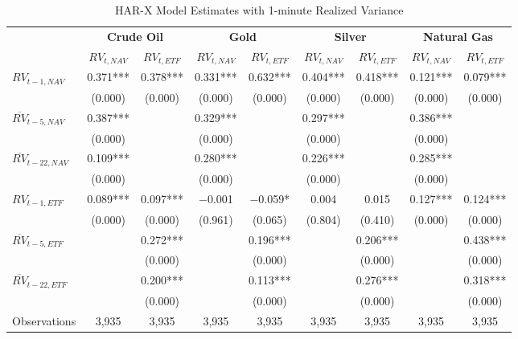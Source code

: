 \begin{landscape}
\begin{table}[htbp]
\centering
\caption{HAR-X Model Estimates with 1-minute Realized Variance}
\label{tab:HAR_1min}
\begin{threeparttable}
\footnotesize
\begin{tabular}{@{}lcccccccc@{}}
\toprule
 & \multicolumn{2}{c}{\textbf{Crude Oil}} & \multicolumn{2}{c}{\textbf{Gold}} & \multicolumn{2}{c}{\textbf{Silver}} & \multicolumn{2}{c}{\textbf{Natural Gas}} \\
\cmidrule(lr){2-3} \cmidrule(lr){4-5} \cmidrule(lr){6-7} \cmidrule(lr){8-9}
 & $RV_{t,NAV}$ & $RV_{t,ETF}$ & $RV_{t,NAV}$ & $RV_{t,ETF}$ & $RV_{t,NAV}$ & $RV_{t,ETF}$ & $RV_{t,NAV}$ & $RV_{t,ETF}$ \\
\midrule
$RV_{t-1,NAV}$ & 0.371*** & 0.378*** & 0.331*** & 0.632*** & 0.404*** & 0.418*** & 0.121*** & 0.079*** \\
               & (0.000) & (0.000) & (0.000) & (0.000) & (0.000) & (0.000) & (0.000) & (0.000) \\
\addlinespace[0.1cm]
$\overline{RV}_{t-5,NAV}$ & 0.387*** &  & 0.329*** &  & 0.297*** &  & 0.386*** &  \\
                         & (0.000) &  & (0.000) &  & (0.000) &  & (0.000) &  \\
\addlinespace[0.1cm]
$\overline{RV}_{t-22,NAV}$ & 0.109*** &  & 0.280*** &  & 0.226*** &  & 0.285*** &  \\
                          & (0.000) &  & (0.000) &  & (0.000) &  & (0.000) &  \\
\addlinespace[0.1cm]
$RV_{t-1,ETF}$ & 0.089*** & 0.097*** & $-$0.001 & $-$0.059* & 0.004 & 0.015 & 0.127*** & 0.124*** \\
               & (0.000) & (0.000) & (0.961) & (0.065) & (0.804) & (0.410) & (0.000) & (0.000) \\
\addlinespace[0.1cm]
$\overline{RV}_{t-5,ETF}$ &  & 0.272*** &  & 0.196*** &  & 0.206*** &  & 0.438*** \\
                         &  & (0.000) &  & (0.000) &  & (0.000) &  & (0.000) \\
\addlinespace[0.1cm]
$\overline{RV}_{t-22,ETF}$ &  & 0.200*** &  & 0.113*** &  & 0.276*** &  & 0.318*** \\
                          &  & (0.000) &  & (0.000) &  & (0.000) &  & (0.000) \\
\midrule
Observations & 3,935 & 3,935 & 3,935 & 3,935 & 3,935 & 3,935 & 3,935 & 3,935 \\

\end{tabular}
\end{threeparttable}
\end{table}
\end{landscape}
